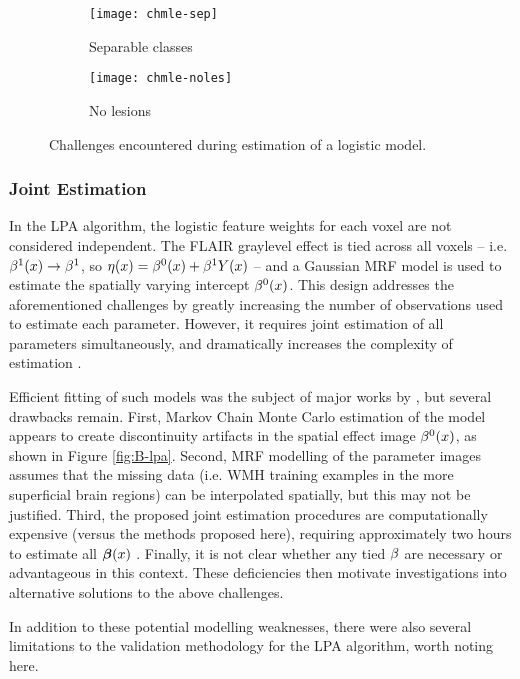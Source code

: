 \begin{figure}
  \centering
  \begin{subfigure}{\plotwidth}
    \texttt{[image: chmle-sep]}\caption{Separable classes}\label{fig:chmle-sep}
  \end{subfigure}
  \begin{subfigure}{\plotwidth}
    \texttt{[image: chmle-noles]}\caption{No lesions}\label{fig:chmle-noles}
  \end{subfigure}
  \caption{Challenges encountered during estimation of a logistic model.}
  \label{fig:chmle}
\end{figure}
\subsubsection{Joint Estimation}
In the LPA algorithm, the logistic feature weights for each voxel are not considered independent. The FLAIR graylevel effect is tied across all voxels -- i.e. $\beta^1(x) \rightarrow \beta^1$, so $\eta(x) = \beta^0(x) + \beta^1Y(x)$ -- and a Gaussian MRF model is used to estimate the spatially varying intercept $\beta^0(x)$. This design addresses the aforementioned challenges by greatly increasing the number of observations used to estimate each parameter. However, it requires joint estimation of all parameters simultaneously, and dramatically increases the complexity of estimation \cite{Schmidt2017a}.
\par
Efficient fitting of such models was the subject of major works by \citeauthor{Schmidt2017} \cite{Schmidt2017,Schmidt2017a}, but several drawbacks remain.
First, Markov Chain Monte Carlo estimation of the model appears to create discontinuity artifacts in the spatial effect image $\beta^0(x)$, as shown in Figure \ref{fig:B-lpa}.
Second, MRF modelling of the parameter images assumes that the missing data (i.e. WMH training examples in the more superficial brain regions) can be interpolated spatially, but this may not be justified.
Third, the proposed joint estimation procedures are computationally expensive (versus the methods proposed here), requiring approximately two hours to estimate all $\bm{\beta}(x)$ \cite{Schmidt2017a}.
Finally, it is not clear whether any tied $\beta$ are necessary or advantageous in this context.
These deficiencies then motivate investigations into alternative solutions to the above challenges.
\par
In addition to these potential modelling weaknesses, there were also several limitations to the validation methodology for the LPA algorithm, worth noting here.

